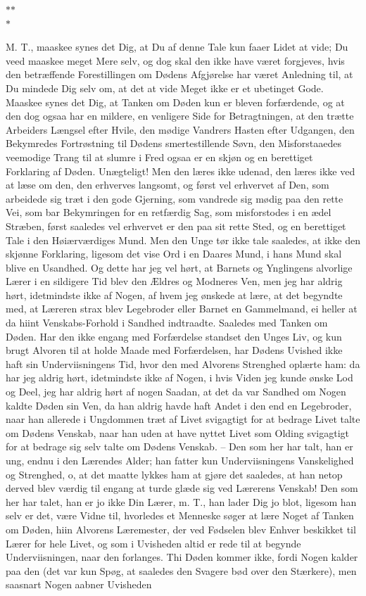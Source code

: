 \documentclass[12pt,a4paper]{article}
\begin{document}
\bigskip
\begin{center}
$*$\quad$*$\\
$*$
\end{center}
\bigskip

M. T., maaskee synes det Dig, at Du af denne Tale kun faaer Lidet at vide; Du veed maaskee meget Mere selv, og dog skal den ikke have været forgjeves, hvis den betræffende Forestillingen om Dødens Afgjørelse har været Anledning til, at Du mindede Dig selv om, at det at vide Meget ikke er et ubetinget Gode. Maaskee synes det Dig, at Tanken om Døden kun er bleven forfærdende, og at den dog ogsaa har en mildere, en venligere Side for Betragtningen, at den trætte Arbeiders Længsel efter Hvile, den mødige Vandrers Hasten efter Udgangen, den Bekymredes Fortrøstning til Dødens smertestillende Søvn, den Misforstaaedes veemodige Trang til at slumre i Fred ogsaa er en skjøn og en berettiget Forklaring af Døden. Unægteligt! Men den læres ikke udenad, den læres ikke ved at læse om den, den erhverves langsomt, og først vel erhvervet af Den, som arbeidede sig træt i den gode Gjerning, som vandrede sig mødig paa den rette Vei, som bar Bekymringen for en retfærdig Sag, som misforstodes i en ædel Stræben, først saaledes vel erhvervet er den paa sit rette Sted, og en berettiget Tale i den Høiærværdiges Mund. Men den Unge tør ikke tale saaledes, at ikke den skjønne Forklaring, ligesom det vise Ord i en Daares Mund, i hans Mund skal blive en Usandhed. Og dette har jeg vel hørt, at Barnets og Ynglingens alvorlige Lærer i en sildigere Tid blev den Ældres og Modneres Ven, men jeg har aldrig hørt, idetmindste ikke af Nogen, af hvem jeg ønskede at lære, at det begyndte med, at Læreren strax blev Legebroder eller Barnet en Gammelmand, ei heller at da hiint Venskabs-Forhold i Sandhed indtraadte. Saaledes med Tanken om Døden. Har den ikke engang med Forfærdelse standset den Unges Liv, og kun brugt Alvoren til at holde Maade med Forfærdelsen, har Dødens Uvished ikke haft sin Underviisningens Tid, hvor den med Alvorens Strenghed oplærte ham: da har jeg aldrig hørt, idetmindste ikke af Nogen, i hvis Viden jeg kunde ønske Lod og Deel, jeg har aldrig hørt af nogen Saadan, at det da var Sandhed om Nogen kaldte Døden sin Ven, da han aldrig havde haft Andet i den end en Legebroder, naar han allerede i Ungdommen træt af Livet svigagtigt for at bedrage Livet talte om Dødens Venskab, naar han uden at have nyttet Livet som Olding svigagtigt for at bedrage sig selv talte om Dødens Venskab. – Den som her har talt, han er ung, endnu i den Lærendes Alder; han fatter kun Underviisningens Vanskelighed og Strenghed, o, at det maatte lykkes ham at gjøre det saaledes, at han netop derved blev værdig til engang at turde glæde sig ved Lærerens Venskab! Den som her har talet, han er jo ikke Din Lærer, m. T., han lader Dig jo blot, ligesom han selv er det, være Vidne til, hvorledes et Menneske søger at lære Noget af Tanken om Døden, hiin Alvorens Læremester, der ved Fødselen blev Enhver beskikket til Lærer for hele Livet, og som i Uvisheden altid er rede til at begynde Underviisningen, naar den forlanges. Thi Døden kommer ikke, fordi Nogen kalder paa den (det var kun Spøg, at saaledes den Svagere bød over den Stærkere), men saasnart Nogen aabner Uvisheden 
\end{document}
